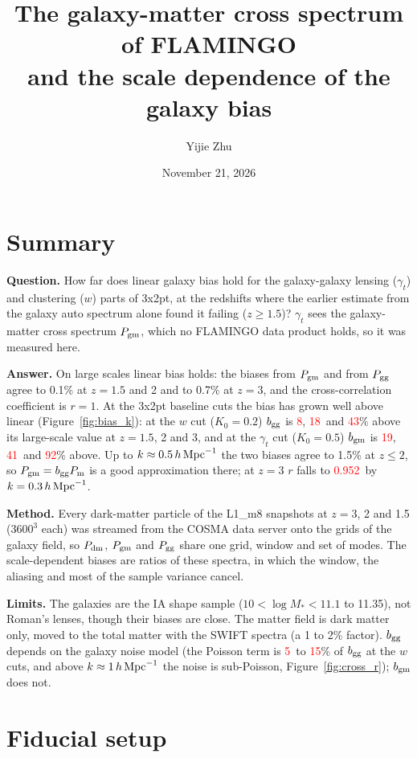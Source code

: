 \documentclass[11pt]{article}
\title{The galaxy-matter cross spectrum of FLAMINGO\\ and the scale dependence of the galaxy bias}
\author{Yijie Zhu}
\date{November 21, 2026}
\newcommand{\hMpc}{\,h\,{\rm Mpc}^{-1}}
\newcommand{\Pgm}{P_{\rm gm}}
\newcommand{\Pgg}{P_{\rm gg}}
\newcommand{\Pdm}{P_{\rm dm}}
\newcommand{\Pm}{P_{\rm m}}
\newcommand{\bgm}{b_{\rm gm}}
\newcommand{\bgg}{b_{\rm gg}}
\newif\ifnumbersfinal
\newcommand{\refresh}[1]{\ifnumbersfinal#1\else\textcolor{red}{#1}\fi}
\newcommand{\wA}{\refresh{8}}
\newcommand{\wB}{\refresh{18}}
\newcommand{\wC}{\refresh{43}}
\newcommand{\gA}{\refresh{19}}
\newcommand{\gB}{\refresh{41}}
\newcommand{\gC}{\refresh{92}}
\newcommand{\rC}{\refresh{0.952}}
\newcommand{\ShotWA}{\refresh{5}}
\newcommand{\ShotWC}{\refresh{15}}
\begin{document}
\maketitle

\section{Summary}

\textbf{Question.} How far does linear galaxy bias hold for the galaxy-galaxy
lensing ($\gamma_t$) and clustering ($w$) parts of 3x2pt, at the redshifts
where the earlier estimate from the galaxy auto spectrum alone found it
failing ($z \ge 1.5$)? $\gamma_t$ sees the galaxy-matter cross spectrum $\Pgm$,
which no FLAMINGO data product holds, so it was measured here.

\textbf{Answer.} On large scales linear bias holds: the biases from $\Pgm$ and
from $\Pgg$ agree to 0.1\% at $z = 1.5$ and 2 and to 0.7\% at $z = 3$, and the
cross-correlation coefficient is $r = 1$. At the 3x2pt baseline cuts the bias
has grown well above linear (Figure~\ref{fig:bias_k}): at the $w$ cut
($K_0 = 0.2$) $\bgg$ is \wA, \wB\ and \wC\% above its large-scale value at
$z = 1.5$, 2 and 3, and at the $\gamma_t$ cut ($K_0 = 0.5$) $\bgm$ is \gA, \gB\
and \gC\% above. Up to $k \approx 0.5\hMpc$ the two biases agree to 1.5\% at
$z \le 2$, so $\Pgm = \bgg \Pm$ is a good approximation there; at $z = 3$
$r$ falls to \rC\ by $k = 0.3\hMpc$.

\textbf{Method.} Every dark-matter particle of the L1\_m8 snapshots at
$z = 3$, 2 and 1.5 ($3600^3$ each) was streamed from the COSMA data server onto
the grids of the galaxy field, so $\Pdm$, $\Pgm$ and $\Pgg$ share one grid,
window and set of modes. The scale-dependent biases are ratios of these
spectra, in which the window, the aliasing and most of the sample variance
cancel.

\textbf{Limits.} The galaxies are the IA shape sample ($10 < \log M_* < 11.1$
to 11.35), not Roman's lenses, though their biases are close. The matter
field is dark matter only, moved to the total matter with the SWIFT spectra
(a 1 to 2\% factor). $\bgg$ depends on the galaxy noise model (the Poisson term is \ShotWA\ to
\ShotWC\% of $\bgg$ at the $w$ cuts, and above $k \approx 1\hMpc$ the noise
is sub-Poisson, Figure~\ref{fig:cross_r}); $\bgm$ does not.

\section{Fiducial setup}
\end{document}
